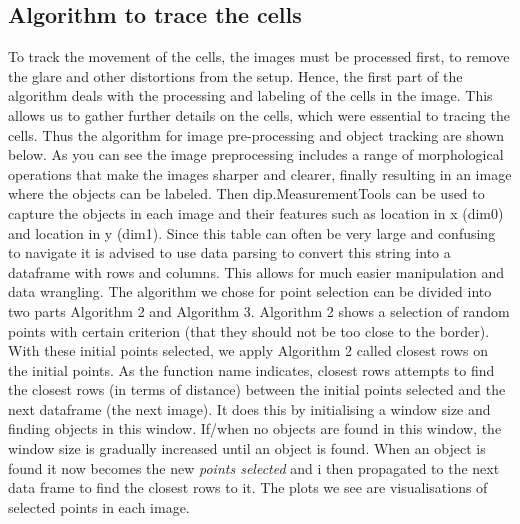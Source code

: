 \documentclass{article}
\begin{document}
\subsection*{Algorithm to trace the cells}
To track the movement of the cells, the images must be processed first, to remove the glare and other distortions from the setup. Hence, the first part of the algorithm deals with the processing and labeling of the cells in the image. This allows us to gather further details on the cells, which were essential to tracing the cells. \newline
Thus the algorithm for image pre-processing and object tracking are shown below. As you can see the image preprocessing includes a range of morphological operations that make the images sharper and clearer, finally resulting in an image where the objects can be labeled. Then dip.MeasurementTools can be used to capture the objects in each image and their features such as location in x (dim0) and location in y (dim1). Since this table can often be very large and confusing to navigate it is advised to use data parsing to convert this string into a dataframe with rows and columns. This allows for much easier manipulation and data wrangling.  \newline
The algorithm we chose for point selection can be divided into two parts Algorithm 2 and Algorithm 3. Algorithm 2 shows a selection of random points with certain criterion (that they should not be too close to the border). With these initial points selected, we apply Algorithm 2 called closest rows on the initial points. As the function name indicates, closest rows attempts to find the closest rows (in terms of distance) between the initial points selected and the next dataframe (the next image). It does this by initialising a window size and finding objects in this window. If/when no objects are found in this window, the window size is gradually increased until an object is found. When an object is found it now becomes the new \emph{points selected} and i then propagated to the next data frame to find the closest rows to it. 
The plots we see are visualisations of selected points in each image. 
\end{document}
